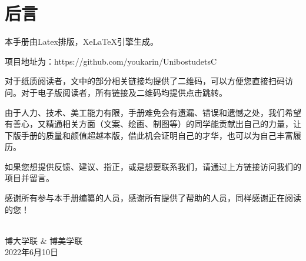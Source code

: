 
% 
%
%
%








\clearpage{\pagestyle{empty}\cleardoublepage}
\chapter*{后言}
\thispagestyle{empty}

本手册由Latex排版，XeLaTeX引擎生成。

\vspace{0.5cm}
项目地址为：https://github.com/youkarin/UnibostudetsC

\vspace{0.5cm}
对于纸质阅读者，文中的部分相关链接均提供了二维码，可以方便您直接扫码访问。对于电子版阅读者，所有链接及二维码均提供点击跳转。

\vspace{0.5cm}
由于人力、技术、美工能力有限，手册难免会有遗漏、错误和遗憾之处，我们希望有善心，又精通相关方面（文案、绘画、制图等）的同学能贡献出自己的力量，让下版手册的质量和颜值超越本版，借此机会证明自己的才华，也可以为自己丰富履历。

\vspace{0.5cm}
如果您想提供反馈、建议、指正，或是想要联系我们，请通过上方链接访问我们的项目并留言。

\vspace{0.5cm}
感谢所有参与本手册编纂的人员，感谢所有提供了帮助的人员，同样感谢正在阅读的您！\\\\

\begin{flushright}
博大学联 \& 博美学联 \\
2022年6月10日
\end{flushright}